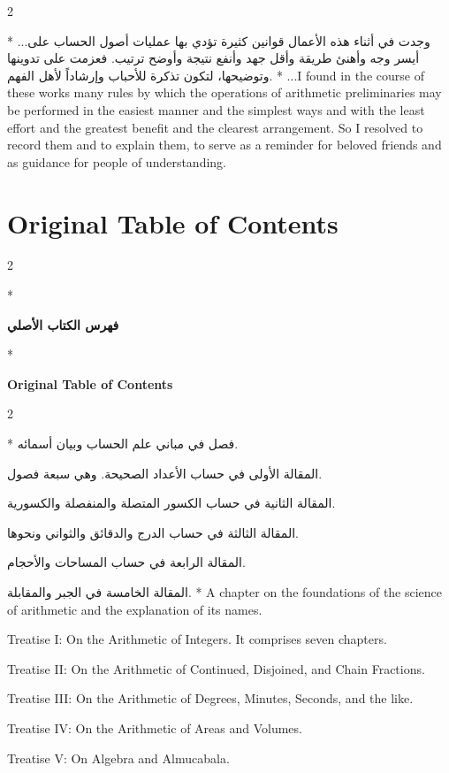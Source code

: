 \documentclass[11pt,a4paper]{article}
\newcommand{\ar}[1]{\arabicfont\beginR #1\endR}
\newenvironment{bilingual}{%
  \vspace{0.3em}%
  \begin{paracol}{2}%
}{%
  \end{paracol}%
  \vspace{0.3em}%
}
\begin{document}
\begin{bilingual}
\switchcolumn[0]*
\ar{...وجدت في أثناء هذه الأعمال قوانين كثيرة تؤدي بها عمليات أصول الحساب على أيسر وجه وأهنئ طريقة وأقل جهد وأنفع نتيجة وأوضح ترتيب. فعزمت على تدوينها وتوضيحها، لتكون تذكرة للأحباب وإرشاداً لأهل الفهم.}
\switchcolumn[1]*
...I found in the course of these works many rules by which the operations of arithmetic
preliminaries may be performed in the easiest manner and the simplest
ways and with the least effort and the greatest benefit and the clearest
arrangement. So I resolved to record them and to explain them, to serve
as a reminder for beloved friends and as guidance for people of
understanding.
\end{bilingual}
\clearpage

\section*{Original Table of Contents}

\begin{bilingual}
\switchcolumn[0]*
\begin{center}
\textbf{\color{chapcolor}\ar{فهرس الكتاب الأصلي}}
\end{center}
\switchcolumn[1]*
\begin{center}
\textbf{\color{chapcolor}Original Table of Contents}
\end{center}
\end{bilingual}

\begin{bilingual}
\switchcolumn[0]*
\ar{فصل في مباني علم الحساب وبيان أسمائه.}

\ar{المقالة الأولى في حساب الأعداد الصحيحة. وهي سبعة فصول.}

\ar{المقالة الثانية في حساب الكسور المتصلة والمنفصلة والكسورية.}

\ar{المقالة الثالثة في حساب الدرج والدقائق والثواني ونحوها.}

\ar{المقالة الرابعة في حساب المساحات والأحجام.}

\ar{المقالة الخامسة في الجبر والمقابلة.}
\switchcolumn[1]*
A chapter on the foundations of the science of arithmetic and the explanation of its names.

Treatise I: On the Arithmetic of Integers. It comprises seven chapters.

Treatise II: On the Arithmetic of Continued, Disjoined, and Chain Fractions.

Treatise III: On the Arithmetic of Degrees, Minutes, Seconds, and the like.

Treatise IV: On the Arithmetic of Areas and Volumes.

Treatise V: On Algebra and Almucabala.
\end{bilingual}
\end{document}

